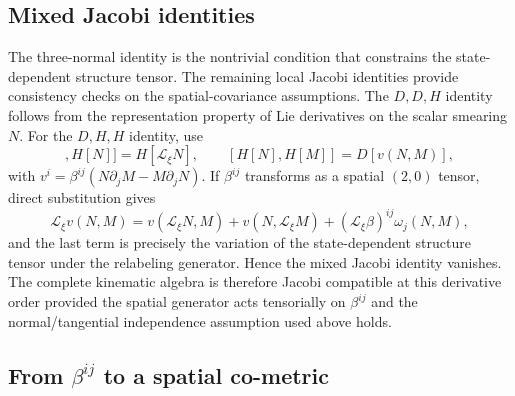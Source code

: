 \documentclass[11pt]{article}
\begin{document}
\subsection{Mixed Jacobi identities}

The three-normal identity is the nontrivial condition that constrains the state-dependent structure tensor. The remaining local Jacobi identities provide consistency checks on the spatial-covariance assumptions. The $D,D,H$ identity follows from the representation property of Lie derivatives on the scalar smearing $N$. For the $D,H,H$ identity, use
\begin{equation}
    [D[\xi],H[N]]=H[\mathcal L_\xi N],
    \qquad
    [H[N],H[M]]=D[v(N,M)],
\end{equation}
with $v^i=\beta^{ij}(N\partial_jM-M\partial_jN)$. If $\beta^{ij}$ transforms as a spatial $(2,0)$ tensor, direct substitution gives
\begin{equation}
    \mathcal L_\xi v(N,M)
    =v(\mathcal L_\xi N,M)+v(N,\mathcal L_\xi M)
      +(\mathcal L_\xi\beta)^{ij}\omega_j(N,M),
\end{equation}
and the last term is precisely the variation of the state-dependent structure tensor under the relabeling generator. Hence the mixed Jacobi identity vanishes. The complete kinematic algebra is therefore Jacobi compatible at this derivative order provided the spatial generator acts tensorially on $\beta^{ij}$ and the normal/tangential independence assumption used above holds.

\subsection{From \texorpdfstring{$\beta^{ij}$}{beta} to a spatial co-metric}
\end{document}

